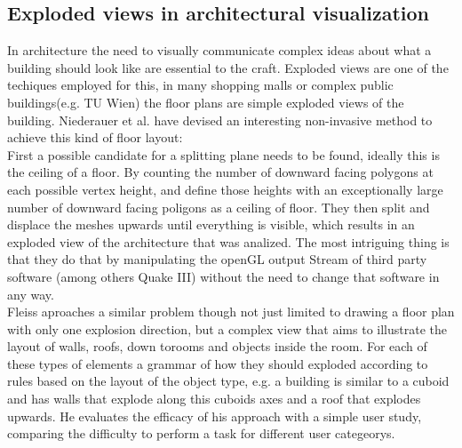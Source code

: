 \subsection{Exploded views in architectural visualization}
In architecture the need to visually communicate complex ideas about what a building should look like are essential to the craft. Exploded views are one of the techiques employed for this, in many shopping malls or complex public buildings(e.g. TU Wien) the floor plans are simple exploded views of the building. Niederauer et al. \cite{proc:conf/si3d/NiederauerHAH03} have devised an interesting non-invasive method to achieve this kind of floor layout:\\
First a possible candidate for a splitting plane needs to be found, ideally this is the ceiling of a floor.
By counting the number of downward facing polygons at each possible vertex height, and define those heights with an exceptionally large number of downward facing poligons as a ceiling of  floor. They then split and displace the meshes upwards until everything is visible, which results in an exploded view of the architecture that was analized. The most intriguing thing is that they do that by manipulating the openGL output Stream of third party software (among others Quake III) without the need to change that software in any way.\\
Fleiss \cite{fleiss-2015} aproaches a similar problem though not just limited to drawing a floor plan with only one explosion direction, but a complex view that aims to illustrate the layout of walls, roofs, down torooms and objects inside the room. For each of these types of elements a grammar of how they should exploded according to rules based on the layout of the object type, e.g. a building is similar to a cuboid and has walls that explode along this cuboids axes and a roof that explodes upwards. He evaluates the efficacy of his approach with a simple user study, comparing the difficulty to perform a task for different user categeorys.\\
